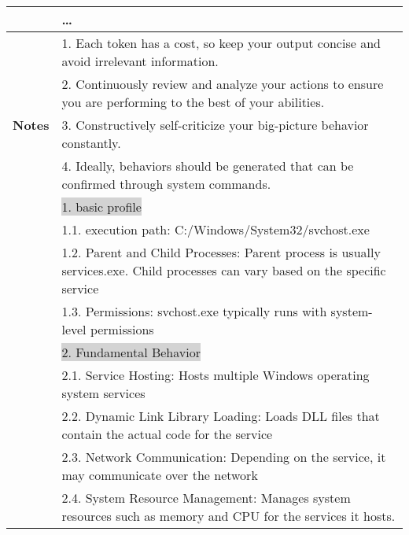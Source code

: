 \begin{table*}[t]
{\begin{tabularx}{\textwidth}{|c|X|}
& \dots \\
\hline
\multirow{5}{*}{\textbf{Notes}} 
& 1. Each token has a cost, so keep your output concise and avoid irrelevant information. \\
& 2. Continuously review and analyze your actions to ensure you are performing to the best of your abilities. \\
& 3. Constructively self-criticize your big-picture behavior constantly. \\
& 4. Ideally, behaviors should be generated that can be confirmed through system commands. \\
\hline
\textbf{\colorbox{codeorange}{LLM Response}} & \colorbox{lightgray}{1. basic profile} \\
& 1.1. execution path: \colorbox{codeorange}{C:/Windows/System32/svchost.exe} \\
& 1.2. Parent and Child Processes: Parent process is usually \colorbox{codeorange}{services.exe}. Child processes can vary based on the specific service \\
& 1.3. Permissions: svchost.exe typically runs with system-level permissions \\
& \colorbox{lightgray}{2. Fundamental Behavior} \\
& 2.1. Service Hosting: Hosts multiple Windows operating system services \\
& 2.2. Dynamic Link Library Loading: Loads DLL files that contain the actual code for the service \\
& 2.3. Network Communication: Depending on the service, it may communicate over the network \\
& 2.4. System Resource Management: Manages system resources such as memory and CPU for the services it hosts. \\ \hline
\end{tabularx}}
\label{table-init-tree}
\end{table*}



